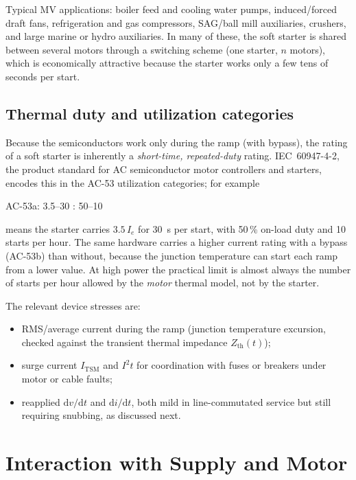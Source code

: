 \documentclass[11pt,a4paper]{article}
\begin{document}
Typical MV applications: boiler feed and cooling water pumps, induced/forced
draft fans, refrigeration and gas compressors, SAG/ball mill auxiliaries,
crushers, and large marine or hydro auxiliaries. In many of these, the soft
starter is shared between several motors through a switching scheme (one
starter, $n$ motors), which is economically attractive because the starter
works only a few tens of seconds per start.

\subsection{Thermal duty and utilization categories}

Because the semiconductors work only during the ramp (with bypass), the
rating of a soft starter is inherently a \emph{short-time, repeated-duty}
rating. IEC~60947-4-2, the product standard for AC semiconductor motor
controllers and starters, encodes this in the AC-53 utilization categories;
for example
\begin{center}
AC-53a: 3.5--30 : 50--10
\end{center}
means the starter carries $3.5\,I_e$ for \SI{30}{\second} per start, with
50\,\% on-load duty and 10 starts per hour. The same hardware carries a
higher current rating with a bypass (AC-53b) than without, because the
junction temperature can start each ramp from a lower value. At high power
the practical limit is almost always the number of starts per hour allowed
by the \emph{motor} thermal model, not by the starter.

The relevant device stresses are:
\begin{itemize}
  \item RMS/average current during the ramp (junction temperature excursion,
        checked against the transient thermal impedance $Z_\mathrm{th}(t)$);
  \item surge current $I_\mathrm{TSM}$ and $I^2t$ for coordination with
        fuses or breakers under motor or cable faults;
  \item reapplied $\mathrm{d}v/\mathrm{d}t$ and $\mathrm{d}i/\mathrm{d}t$,
        both mild in line-commutated service but still requiring snubbing,
        as discussed next.
\end{itemize}

\section{Interaction with Supply and Motor}
\end{document}
